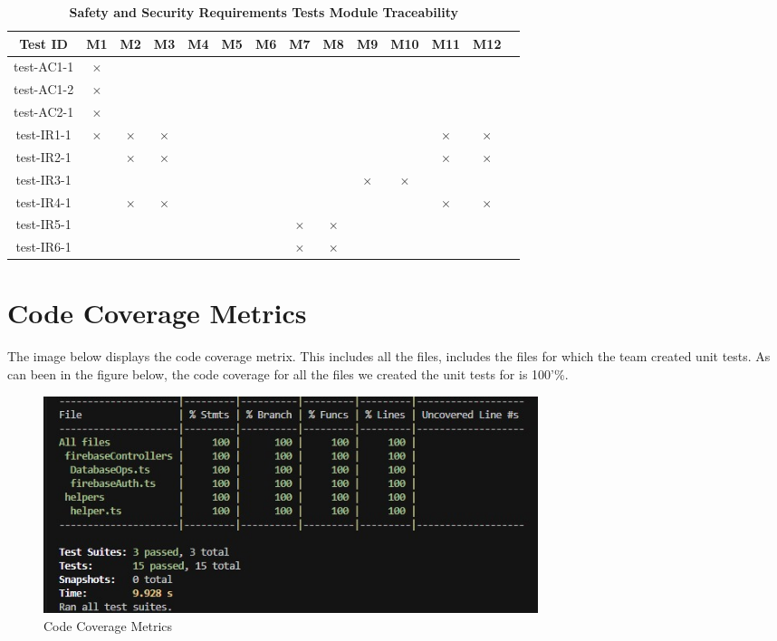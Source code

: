 \documentclass[12pt, titlepage]{article}
\begin{document}
\begin{table} [H]
  \centering
  \begin{tabular}{|c|c|c|c|c|c|c|c|c|c|c|c|c|c|}
  \hline
  Test ID & M1 & M2 & M3 & M4 & M5 & M6 & M7 & M8 & M9 & M10 & M11 & M12 \\
  \hline
  test-AC1-1 & $\times$ & & & & & & & & & & & \\
  \hline
  test-AC1-2 & $\times$ & & & & & & & & & & & \\
  \hline
  test-AC2-1 & $\times$ & & & & & & & & & & & \\
  \hline
  test-IR1-1 & $\times$ & $\times$ & $\times$ & & & & & & & & $\times$ & $\times$\\
  \hline
  test-IR2-1 & & $\times$ & $\times$ & & & & & & & & $\times$ & $\times$\\
  \hline
  test-IR3-1 & & & & & & & & & $\times$ & $\times$ & &\\
  \hline
  test-IR4-1 & & $\times$ & $\times$ & & & & & & & & $\times$ & $\times$\\
  \hline
  test-IR5-1 & & & & & & & $\times$ & $\times$ & & & &\\
  \hline
  test-IR6-1 & & & & & & & $\times$ & $\times$ & & & &\\
  \hline
\end{tabular}
\caption{\bf Safety and Security Requirements Tests Module Traceability} \label{tab:sns-test-traceability}
\end{table}

\newpage

\section{Code Coverage Metrics}

The image below displays the code coverage metrix. This includes all the files, includes the files for which the team created unit tests. As can been in the figure below, the code coverage for all the files we created the unit tests for is 100'\%.

\begin{figure}[h]
  \centering
  \includegraphics[width=0.7\textwidth]{CodeCoverageMetrics.jpg}
  \caption{Code Coverage Metrics}
  \label{FigUH}
\end{figure}
\end{document}
